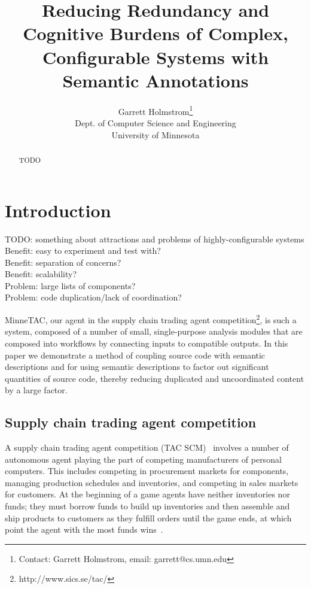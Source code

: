 \documentclass{article}
\begin{document}
\title{Reducing Redundancy and Cognitive Burdens of Complex, Configurable Systems with Semantic Annotations}

\author{Garrett Holmstrom\thanks{Contact: Garrett Holmstrom, email: garrett@cs.umn.edu} \\ Dept. of Computer Science and Engineering \\ University of Minnesota
}

\maketitle

\begin{quote}
\begin{abstract}

TODO

\end{abstract}
\end{quote}

\section{Introduction}

TODO:  something about attractions and problems of highly-configurable systems \\
Benefit:  easy to experiment and test with? \\
Benefit:  separation of concerns? \\
Benefit:  scalability? \\
Problem:  large lists of components? \\
Problem:  code duplication/lack of coordination?

MinneTAC, our agent in the supply chain trading agent competition\footnote{http://www.sics.se/tac/}, is such a system, composed of a number of small, single-purpose analysis modules that are composed into workflows by connecting inputs to compatible outputs.
In this paper we demonstrate a method of coupling source code with semantic descriptions and for using semantic descriptions to factor out significant quantities of source code, thereby reducing duplicated and uncoordinated content by a large factor.

\subsection{Supply chain trading agent competition}

A supply chain trading agent competition (TAC SCM)~\cite{Collins06a} involves a number of autonomous agent playing the part of competing manufacturers of personal computers.
This includes competing in procurement markets for components, managing production schedules and inventories, and competing in sales markets for customers.
At the beginning of a game agents have neither inventories nor funds; they must borrow funds to build up inventories and then assemble and ship products to customers as they fulfill orders until the game ends, at which point the agent with the most funds wins~\cite{Collins08ECRA}.
\end{document}
